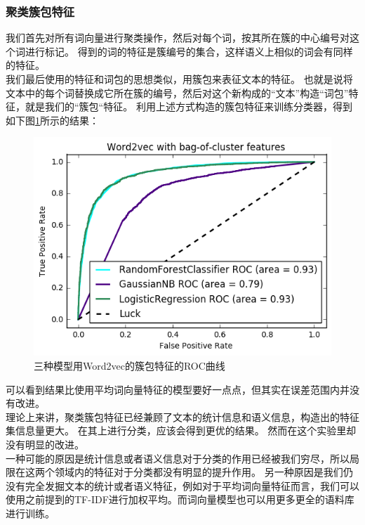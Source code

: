 \subsubsection{聚类簇包特征}
我们首先对所有词向量进行聚类操作，然后对每个词，按其所在簇的中心编号对这个词进行标记。
得到的词的特征是簇编号的集合，这样语义上相似的词会有同样的特征。\\
我们最后使用的特征和词包的思想类似，用簇包来表征文本的特征。
也就是说将文本中的每个词替换成它所在簇的编号，然后对这个新构成的“文本”构造“词包”特征，就是我们的“簇包“特征。
利用上述方式构造的簇包特征来训练分类器，得到如下图\ref{fig:3cword2veccluster}所示的结果：
\begin{figure}[h]
\centering
\includegraphics[width=0.9\linewidth]{3c_word2vec_cluster}
\caption[word2vec_cluster]{三种模型用Word2vec的簇包特征的ROC曲线}
\label{fig:3cword2veccluster}
\end{figure}

可以看到结果比使用平均词向量特征的模型要好一点点，但其实在误差范围内并没有改进。\\
理论上来讲，聚类簇包特征已经兼顾了文本的统计信息和语义信息，构造出的特征集信息量更大。
在其上进行分类，应该会得到更优的结果。
然而在这个实验里却没有明显的改进。\\
一种可能的原因是统计信息或者语义信息对于分类的作用已经被我们穷尽，所以局限在这两个领域内的特征对于分类都没有明显的提升作用。
另一种原因是我们仍没有完全发掘文本的统计或者语义特征，例如对于平均词向量特征而言，我们可以使用之前提到的TF-IDF进行加权平均。而词向量模型也可以用更多更全的语料库进行训练。